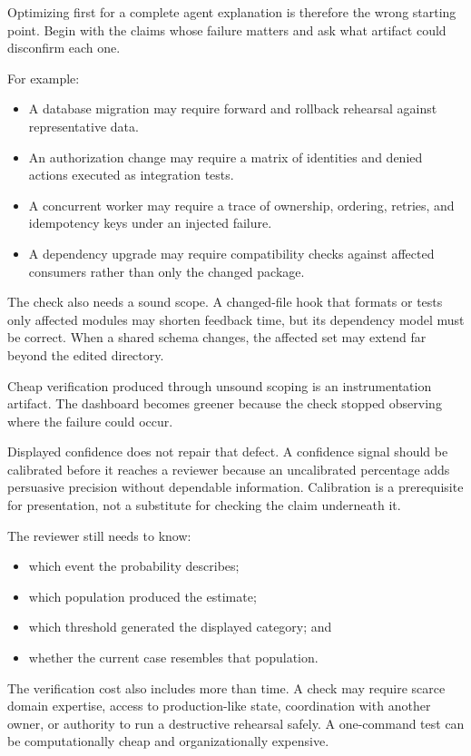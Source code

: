 Optimizing first for a complete agent explanation is therefore the wrong starting point. Begin with the claims whose failure matters and ask what artifact could disconfirm each one.

For example:

\begin{itemize}
\tightlist
\item
  A database migration may require forward and rollback rehearsal against representative data.
\item
  An authorization change may require a matrix of identities and denied actions executed as integration tests.
\item
  A concurrent worker may require a trace of ownership, ordering, retries, and idempotency keys under an injected failure.
\item
  A dependency upgrade may require compatibility checks against affected consumers rather than only the changed package.
\end{itemize}

The check also needs a sound scope. A changed-file hook that formats or tests only affected modules may shorten feedback time, but its dependency model must be correct. When a shared schema changes, the affected set may extend far beyond the edited directory.

Cheap verification produced through unsound scoping is an instrumentation artifact. The dashboard becomes greener because the check stopped observing where the failure could occur.

Displayed confidence does not repair that defect. A confidence signal should be calibrated before it reaches a reviewer because an uncalibrated percentage adds persuasive precision without dependable information. Calibration is a prerequisite for presentation, not a substitute for checking the claim underneath it.

The reviewer still needs to know:

\begin{itemize}
\tightlist
\item
  which event the probability describes;
\item
  which population produced the estimate;
\item
  which threshold generated the displayed category; and
\item
  whether the current case resembles that population.
\end{itemize}

The verification cost also includes more than time. A check may require scarce domain expertise, access to production-like state, coordination with another owner, or authority to run a destructive rehearsal safely. A one-command test can be computationally cheap and organizationally expensive.

